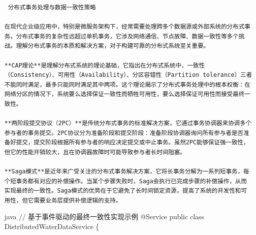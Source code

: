 \begin{lstlisting}
 分布式事务处理与数据一致性策略

在现代企业级应用中，特别是微服务架构下，经常需要处理跨多个数据源或外部系统的分布式事务。分布式事务的复杂性远超过单机事务，它涉及网络通信、节点故障、数据一致性等多个挑战。理解分布式事务的本质和解决方案，对于构建可靠的分布式系统至关重要。

**CAP理论**是理解分布式系统的理论基础，它指出在分布式系统中，一致性（Consistency）、可用性（Availability）、分区容错性（Partition tolerance）三者不能同时满足，最多只能同时满足其中两项。这个理论揭示了分布式事务处理中的根本权衡：在网络分区的情况下，系统要么选择保证一致性而牺牲可用性，要么选择保证可用性而接受最终一致性。

**两阶段提交协议（2PC）**是传统分布式事务的标准解决方案，它通过事务协调器来协调多个参与者的事务提交。2PC协议分为准备阶段和提交阶段：准备阶段协调器询问所有参与者是否准备好提交，提交阶段根据所有参与者的响应决定提交或中止事务。虽然2PC能够保证强一致性，但它的性能开销较大，且在协调器故障时可能导致参与者长时间阻塞。

**Saga模式**是近年来广受关注的分布式事务解决方案，它将长事务分解为一系列短事务，每个短事务都有对应的补偿操作。当某个步骤失败时，Saga会执行已完成步骤的补偿操作，从而实现最终的一致性。Saga模式的优势在于它避免了长时间锁定资源，提高了系统的并发性和可用性，但它需要业务层提供补偿逻辑的支持。
\end{lstlisting}

java // 基于事件驱动的最终一致性实现示例 @Service public class DistributedWaterDataService \{

